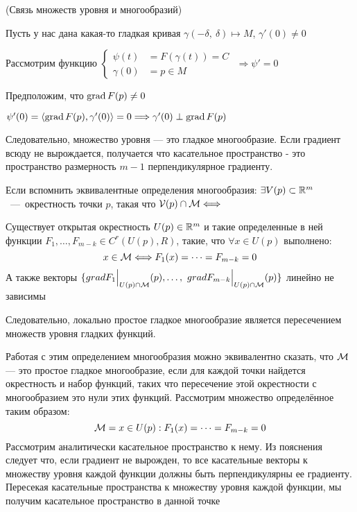 \begin{explanation} (Связь множеств уровня и многообразий)

Пусть у нас дана какая-то гладкая кривая $\gamma (-\delta, \ \delta) \mapsto M$, $\gamma'(0) \neq 0$

Рассмотрим функцию  $
\left\{ \begin{aligned} 
  \psi(t) &= F(\gamma(t)) = C \\
  \gamma(0) &= p \in M
\end{aligned} \right.
$ $\Longrightarrow \psi' = 0$

Предположим, что $\operatorname{grad} F(p) \neq 0$

$\psi'(0) = \langle \operatorname{grad} F(p), \gamma'(0) \rangle = 0 \Longrightarrow \gamma'(0) \perp \operatorname{grad} F(p)$

Следовательно, множество уровня — это гладкое многообразие. Если градиент всюду не вырождается, получается что касательное пространство - это пространство размерность $m-1$ перпендикулярное градиенту.
\end{explanation}

Если вспомнить эквивалентные определения многообразия:
 $\exists V(p) \subset \mathbb{R}^m$~---~окрестность точки $p$, такая что $\mathcal{V}(p) \cap \mathcal{M} \Longleftrightarrow$

 Существует открытая окрестность $U(p) \in \mathbb{R}^m$ и такие определенные в ней функции $F_{1}, \dots , F_{m-k} \in C^{r}(U(p), R)$, такие, что $\forall x \in U(p)$ выполнено:
    $$x \in \mathcal{M} \Longleftrightarrow F_{1}(x) = \dots = F_{m-k} = 0$$
    А также векторы $\{grad F_1\Bigr|_{U(p) \cap \mathcal{M}}(p),\dots, \ grad F_{m-k}\Bigr|_{U(p) \cap \mathcal{M}}(p)\}$ линейно не зависимы

    Следовательно, локально простое гладкое многообразие является пересечением множеств уровня гладких функций.

    Работая с этим определением многообразия можно эквивалентно сказать, что $\mathcal{M}$ — это простое гладкое многообразие, если для каждой точки найдется окрестность и набор функций, таких что пересечение этой окрестности с многообразием это нули этих функций. Рассмотрим множество определённое таким образом:
    $$\mathcal{M}  = {x \in U(p): F_{1}(x) = \dots = F_{m-k} = 0}$$
    Рассмотрим аналитически касательное пространство к нему. Из пояснения следует что, если градиент не вырожден, то все касательные векторы к множеству уровня каждой функции должны быть перпендикулярны ее градиенту. Пересекая касательные пространства к множеству уровня каждой функции, мы получим касательное пространство в данной точке

